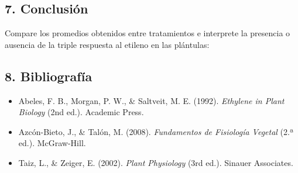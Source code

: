 \documentclass[
  spanish,
  10pt,
  letterpaper,
  twocolumn]{article}
\providecommand{\tightlist}{%
  \setlength{\itemsep}{0pt}\setlength{\parskip}{0pt}}
\begin{document}
\hrulefill

\hrulefill

\hrulefill

\hrulefill

\hrulefill

\subsection{7. Conclusión}\label{conclusiuxf3n}

Compare los promedios obtenidos entre tratamientos e interprete la
presencia o ausencia de la triple respuesta al etileno en las plántulas:

\hrulefill

\hrulefill

\hrulefill

\hrulefill

\hrulefill

\subsection{8. Bibliografía}\label{bibliografuxeda}

\begin{itemize}
\tightlist
\item
  Abeles, F. B., Morgan, P. W., \& Saltveit, M. E. (1992).
  \emph{Ethylene in Plant Biology} (2nd ed.). Academic Press.
\item
  Azcón-Bieto, J., \& Talón, M. (2008). \emph{Fundamentos de Fisiología
  Vegetal} (2.ª ed.). McGraw-Hill.
\item
  Taiz, L., \& Zeiger, E. (2002). \emph{Plant Physiology} (3rd ed.).
  Sinauer Associates.
\end{itemize}
\end{document}

